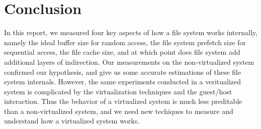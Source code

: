 \section{Conclusion}
\label{section:conclusion}

In this report, we measured four key aspects of how a file system works internally, namely the ideal buffer size for random access, the file system prefetch size for sequential access, the file cache size, and at which point does file system add additional layers of indirection. Our measurements on the non-virtualized system confirmed our hypothesis, and give us some accurate estimations of these file system internals. However, the same experiments conducted in a veritualized system is complicated by the virtualization techniques and the guest/host interaction. Thus the behavior of a virtualized system is much less preditable than a non-virtualized system, and we need new techiques to measure and understand how a virtualized system works.
